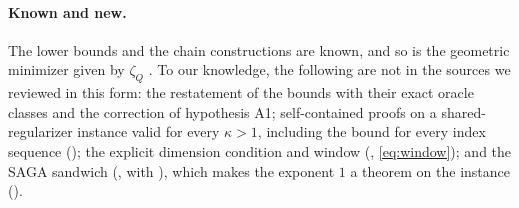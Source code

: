 \paragraph{Known and new.}
The lower bounds and the chain constructions \cite{nesterov2018lectures,agarwal2015lower,lan2018optimal} are known, and so
is the geometric minimizer given by $\zeta_Q$ \cite{lan2018optimal}. To our knowledge, the following are not in the
sources we reviewed in this form: the restatement of the bounds with their exact oracle classes and the correction of
hypothesis A1; self-contained proofs on a shared-regularizer instance valid for every $\kappa>1$, including the bound for
every index sequence (); the explicit dimension condition and window (,
\eqref{eq:window}); and the SAGA sandwich (, with ), which makes the exponent $1$
a theorem on the instance ().

